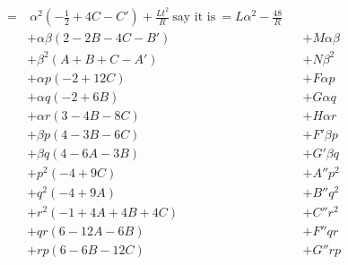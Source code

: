 \documentclass[11pt,a4paper]{article}
\begin{document}
\begin{align*}
= & \ \alpha^2\!\left(- \tfrac{1}{2} + 4 C - C'\right) + \frac{Lt^2}{R}\ \text{say it is}\ = L \alpha^2 - \frac{48}{R}\\
& + \alpha \beta(2 - 2 B - 4 C - B') & & + M \alpha \beta\\
& + \beta^2(A + B + C - A') & & + N \beta^2\\
& + \alpha p(- 2 + 12 C) & & + F \alpha p\\
& + \alpha q(- 2 + 6 B) & & + G \alpha q\\
& + \alpha r(3 - 4 B - 8 C) & & + H \alpha r\\
& + \beta p(4 - 3 B - 6 C) & & + F' \beta p\\
& + \beta q(4 - 6 A - 3 B) & & + G' \beta q\\
& + p^2(- 4 + 9 C) & & + A'' p^2\\
& + q^2(- 4 + 9 A) & & + B'' q^2\\
& + r^2(- 1 + 4 A + 4 B + 4 C) & & + C'' r^2\\
& + q r(6 - 12 A - 6 B) & & + F'' q r\\
& + r p(6 - 6 B - 12 C) & & + G'' r p
\end{align*}
\end{document}
